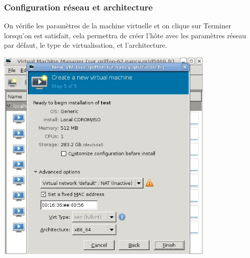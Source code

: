 \subsubsection{ Configuration réseau et architecture}
On vérifie les paramètres de la machine virtuelle et on clique sur Terminer lorsqu'on est satisfait, cela permettra de créer l'hôte avec les paramètres réseau par défaut, le type de virtualisation, et l'architecture.
\begin{center}
\includegraphics[width=300pt]{images/reseau.jpg}
\end{center}


